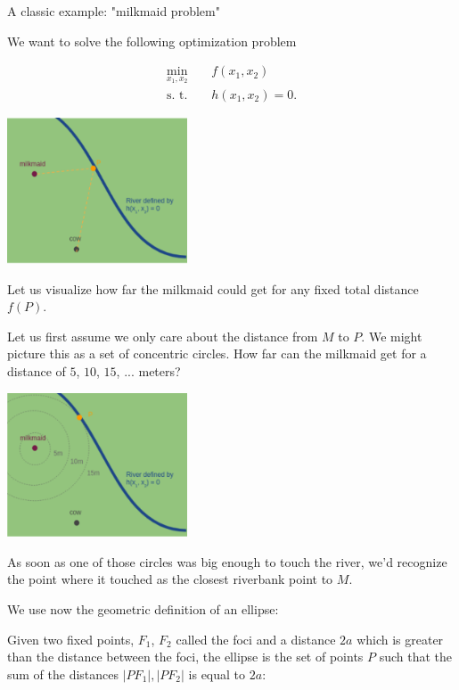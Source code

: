 \begin{vbframe}{A classic example: "milkmaid problem"}
\framebreak 

We want to solve the following optimization problem 

\begin{eqnarray*}
	\min_{x_1, x_2} && f(x_1, x_2) \\
	\text{s. t. } && h(x_1, x_2) = 0.
\end{eqnarray*}


\begin{center}
	\includegraphics[width = 0.4\textwidth]{figure_man/milkmaid2.png}
\end{center}


\framebreak 

Let us visualize how far the milkmaid could get for any fixed total distance $f(P)$. 

\vspace*{0.2cm}

Let us first assume we only care about the distance from $M$ to $P$. We might picture this as a set of concentric circles. How far can the milkmaid get for a distance of $5$, $10$, $15$, ... meters?

\begin{center}
	\includegraphics[width = 0.4\textwidth]{figure_man/milkmaid3.png}
\end{center}

As soon as one of those circles was big enough to touch the river, we'd recognize the point where it touched as the closest riverbank point to $M$. 

\framebreak 

We use now the geometric definition of an ellipse: 

Given two fixed points, $F_1$, $F_2$ called the foci and a distance $2a$ which is greater than the distance between the foci, the ellipse is the set of points $P$ such that the sum of the distances $|PF_1|, |PF_2|$ is equal to $2a$: 


\end{vbframe}

